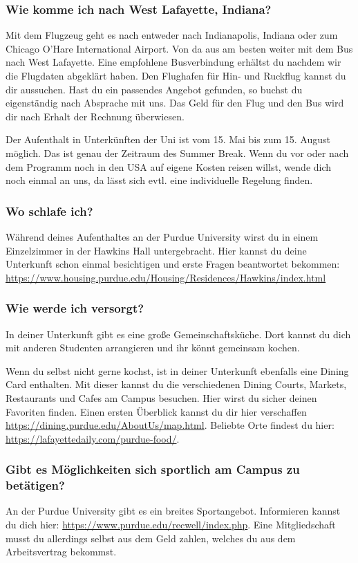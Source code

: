 \documentclass[
  paper=a4,
  fontsize=12pt,
  DIV=16,
  headheight=52pt,
  footheight=45pt,
  headinclude,
  parskip=full,
]{scrartcl}
\begin{document}
\subsubsection*{Wie komme ich nach West Lafayette, Indiana?}
Mit dem Flugzeug geht es nach entweder nach Indianapolis, Indiana oder zum
Chicago O'Hare International Airport.
Von da aus am besten weiter mit dem Bus nach West Lafayette.
Eine empfohlene Busverbindung erhältst du nachdem wir die Flugdaten abgeklärt
haben.
Den Flughafen für Hin- und Ruckflug kannst du dir aussuchen.
Hast du ein passendes Angebot gefunden, so buchst du eigenständig nach Absprache mit uns.
Das Geld für den Flug und den Bus wird dir nach Erhalt der Rechnung überwiesen.

Der Aufenthalt in Unterkünften der Uni ist vom 15. Mai bis zum 15. August
möglich. Das ist genau der Zeitraum des Summer Break. Wenn du vor oder nach dem
Programm noch in den USA auf eigene Kosten reisen willst, wende dich noch einmal an uns, da lässt sich evtl. eine individuelle Regelung finden.


\subsubsection*{Wo schlafe ich?}
Während deines Aufenthaltes an der Purdue University wirst du in einem Einzelzimmer
in der Hawkins Hall untergebracht.
Hier kannst du deine Unterkunft schon einmal besichtigen und erste Fragen beantwortet bekommen: \url{https://www.housing.purdue.edu/Housing/Residences/Hawkins/index.html}

\subsubsection*{Wie werde ich versorgt?}
In deiner Unterkunft gibt es eine große Gemeinschaftsküche.
Dort kannst du dich mit anderen Studenten arrangieren und ihr könnt gemeinsam kochen.

Wenn du selbst nicht gerne kochst, ist in deiner Unterkunft ebenfalls eine
Dining Card enthalten.
Mit dieser kannst du die verschiedenen Dining Courts, Markets, Restaurants und Cafes am Campus besuchen.
Hier wirst du sicher deinen Favoriten finden.
Einen ersten Überblick kannst du dir hier verschaffen \url{https://dining.purdue.edu/AboutUs/map.html}.
Beliebte Orte findest du hier: \url{https://lafayettedaily.com/purdue-food/}.

\subsubsection*{Gibt es Möglichkeiten sich sportlich am Campus zu betätigen?}
An der Purdue University gibt es ein breites Sportangebot.
Informieren kannst du dich hier: \url{https://www.purdue.edu/recwell/index.php}.
Eine Mitgliedschaft musst du allerdings selbst aus dem Geld zahlen, welches du aus dem Arbeitsvertrag bekommst.
\end{document}
